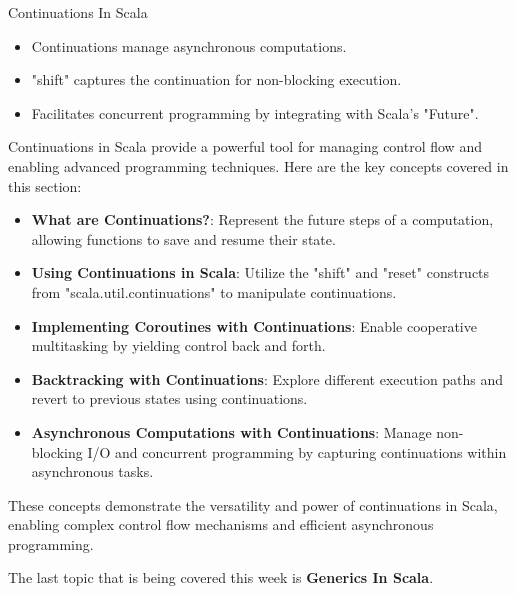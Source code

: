 \begin{notes}{Continuations In Scala}
\begin{highlight}
        \begin{itemize}
            \item Continuations manage asynchronous computations.
            \item "shift" captures the continuation for non-blocking execution.
            \item Facilitates concurrent programming by integrating with Scala's "Future".
        \end{itemize}
    
    \end{highlight}
    
    \begin{highlight}
    
        Continuations in Scala provide a powerful tool for managing control flow and enabling advanced programming techniques. Here are the key concepts covered in this section:
    
        \begin{itemize}
            \item \textbf{What are Continuations?}: Represent the future steps of a computation, allowing functions to save and resume their state.
            \item \textbf{Using Continuations in Scala}: Utilize the "shift" and "reset" constructs from "scala.util.continuations" to manipulate continuations.
            \item \textbf{Implementing Coroutines with Continuations}: Enable cooperative multitasking by yielding control back and forth.
            \item \textbf{Backtracking with Continuations}: Explore different execution paths and revert to previous states using continuations.
            \item \textbf{Asynchronous Computations with Continuations}: Manage non-blocking I/O and concurrent programming by capturing continuations within asynchronous tasks.
        \end{itemize}
    
        These concepts demonstrate the versatility and power of continuations in Scala, enabling complex control flow mechanisms and efficient asynchronous programming.
    
    \end{highlight}
\end{notes}

The last topic that is being covered this week is \textbf{Generics In Scala}.

